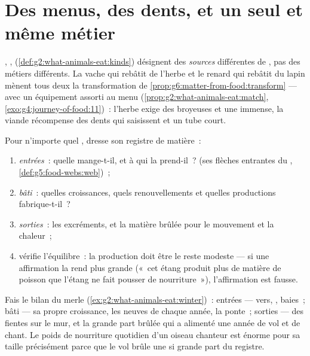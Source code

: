 \section{Des menus, des dents, et un seul et même métier}

\begin{proposition}\label{prop:g6:matter-from-food:menus}
, , 
(\cref{def:g2:what-animals-eat:kinds}) désignent des
\emph{sources} différentes de , pas des métiers
différents. La vache qui rebâtit de l'herbe et le renard qui rebâtit
du lapin mènent tous deux la transformation de
\cref{prop:g6:matter-from-food:transform} --- avec un équipement
assorti au menu
(\cref{prop:g2:what-animals-eat:match},
\cref{exo:g4:journey-of-food:11})~: l'herbe exige des broyeuses et
une  immense, la viande récompense des dents qui saisissent
et un tube court.
\end{proposition}
\admitted

\begin{method}\label{met:g6:matter-from-food:audit}
Pour n'importe quel , dresse son registre de matière~:
\begin{enumerate}
  \item \emph{entrées}~: quelle  mange-t-il, et à
        qui la prend-il~? (ses flèches entrantes du , \cref{def:g5:food-webs:web})~;
  \item \emph{bâti}~: quelles croissances, quels renouvellements et
        quelles productions fabrique-t-il~?
  \item \emph{sorties}~: les excréments, et la matière brûlée pour
        le mouvement et la chaleur~;
  \item vérifie l'équilibre~: la production doit être le reste
        modeste --- si une affirmation la rend plus grande
        («~cet étang produit plus de matière de poisson que
        l'étang ne fait pousser de nourriture~»), l'affirmation est
        fausse.
\end{enumerate}
\end{method}

\begin{example}\label{ex:g6:matter-from-food:audituse}
Fais le bilan du merle (\cref{ex:g2:what-animals-eat:winter})~:
entrées --- vers, , baies~; bâti --- sa propre croissance,
les  neuves de chaque année, la ponte~; sorties --- des
fientes sur le mur, et la grande part brûlée qui a alimenté une
année de vol et de chant. Le poids de nourriture quotidien d'un
oiseau chanteur est énorme pour sa taille précisément parce que le
vol brûle une si grande part du registre.
\end{example}

